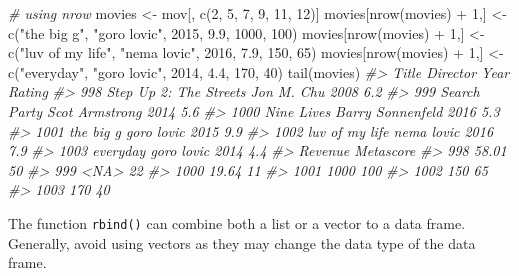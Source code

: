 \documentclass[
]{book}
\newenvironment{Shaded}{\begin{snugshade}}{\end{snugshade}}
\newcommand{\CommentTok}[1]{\textcolor[rgb]{0.56,0.35,0.01}{\textit{#1}}}
\newcommand{\DecValTok}[1]{\textcolor[rgb]{0.00,0.00,0.81}{#1}}
\newcommand{\FloatTok}[1]{\textcolor[rgb]{0.00,0.00,0.81}{#1}}
\newcommand{\FunctionTok}[1]{\textcolor[rgb]{0.00,0.00,0.00}{#1}}
\newcommand{\NormalTok}[1]{#1}
\newcommand{\OtherTok}[1]{\textcolor[rgb]{0.56,0.35,0.01}{#1}}
\newcommand{\SpecialCharTok}[1]{\textcolor[rgb]{0.00,0.00,0.00}{#1}}
\newcommand{\StringTok}[1]{\textcolor[rgb]{0.31,0.60,0.02}{#1}}
\begin{document}
\begin{Shaded}
\begin{Highlighting}[]
\CommentTok{\# using nrow}
\NormalTok{movies }\OtherTok{\textless{}{-}}\NormalTok{ mov[, }\FunctionTok{c}\NormalTok{(}\DecValTok{2}\NormalTok{, }\DecValTok{5}\NormalTok{, }\DecValTok{7}\NormalTok{, }\DecValTok{9}\NormalTok{, }\DecValTok{11}\NormalTok{, }\DecValTok{12}\NormalTok{)]}
\NormalTok{movies[}\FunctionTok{nrow}\NormalTok{(movies) }\SpecialCharTok{+} \DecValTok{1}\NormalTok{,] }\OtherTok{\textless{}{-}} \FunctionTok{c}\NormalTok{(}\StringTok{"the big g"}\NormalTok{, }\StringTok{"goro lovic"}\NormalTok{, }\DecValTok{2015}\NormalTok{, }\FloatTok{9.9}\NormalTok{, }\DecValTok{1000}\NormalTok{, }\DecValTok{100}\NormalTok{)}
\NormalTok{movies[}\FunctionTok{nrow}\NormalTok{(movies) }\SpecialCharTok{+} \DecValTok{1}\NormalTok{,] }\OtherTok{\textless{}{-}} \FunctionTok{c}\NormalTok{(}\StringTok{"luv of my life"}\NormalTok{, }\StringTok{"nema lovic"}\NormalTok{, }\DecValTok{2016}\NormalTok{, }\FloatTok{7.9}\NormalTok{, }\DecValTok{150}\NormalTok{, }\DecValTok{65}\NormalTok{)}
\NormalTok{movies[}\FunctionTok{nrow}\NormalTok{(movies) }\SpecialCharTok{+} \DecValTok{1}\NormalTok{,] }\OtherTok{\textless{}{-}} \FunctionTok{c}\NormalTok{(}\StringTok{"everyday"}\NormalTok{, }\StringTok{"goro lovic"}\NormalTok{, }\DecValTok{2014}\NormalTok{, }\FloatTok{4.4}\NormalTok{, }\DecValTok{170}\NormalTok{, }\DecValTok{40}\NormalTok{)}
\FunctionTok{tail}\NormalTok{(movies)}
\CommentTok{\#\textgreater{}                       Title         Director Year Rating}
\CommentTok{\#\textgreater{} 998  Step Up 2: The Streets       Jon M. Chu 2008    6.2}
\CommentTok{\#\textgreater{} 999            Search Party   Scot Armstrong 2014    5.6}
\CommentTok{\#\textgreater{} 1000             Nine Lives Barry Sonnenfeld 2016    5.3}
\CommentTok{\#\textgreater{} 1001              the big g       goro lovic 2015    9.9}
\CommentTok{\#\textgreater{} 1002         luv of my life       nema lovic 2016    7.9}
\CommentTok{\#\textgreater{} 1003               everyday       goro lovic 2014    4.4}
\CommentTok{\#\textgreater{}      Revenue Metascore}
\CommentTok{\#\textgreater{} 998    58.01        50}
\CommentTok{\#\textgreater{} 999     \textless{}NA\textgreater{}        22}
\CommentTok{\#\textgreater{} 1000   19.64        11}
\CommentTok{\#\textgreater{} 1001    1000       100}
\CommentTok{\#\textgreater{} 1002     150        65}
\CommentTok{\#\textgreater{} 1003     170        40}
\end{Highlighting}
\end{Shaded}

The function \texttt{rbind()} can combine both a list or a vector to a data frame. Generally, avoid using vectors as they may change the data type of the data frame.
\end{document}
